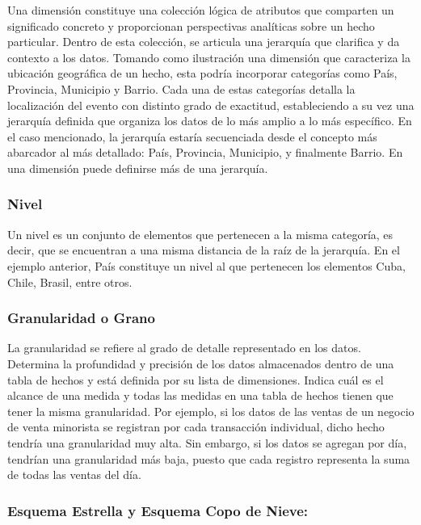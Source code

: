 Una dimensión constituye una colección lógica de atributos que comparten un significado concreto y proporcionan 
perspectivas analíticas sobre un hecho particular. Dentro de esta colección, se articula una jerarquía que clarifica y da contexto a los 
datos. Tomando como ilustración una dimensión que caracteriza la ubicación geográfica de un hecho, esta podría incorporar categorías 
como País, Provincia, Municipio y Barrio. Cada una de estas categorías detalla la localización del evento con distinto grado de 
exactitud, estableciendo a su vez una jerarquía definida que organiza los datos de lo más amplio a lo más específico. En el 
caso mencionado, la jerarquía estaría secuenciada desde el concepto más abarcador al más detallado: País, Provincia, 
Municipio, y finalmente Barrio. En una dimensión puede definirse m\'as de una jerarquía\cite{lismaster}.

\subsubsection{Nivel}

Un nivel es un conjunto de elementos que pertenecen a la misma categoría, es decir, que se encuentran a una misma distancia 
de la raíz de la jerarquía. En el ejemplo anterior, Pa\'is constituye un nivel al que pertenecen los elementos Cuba, Chile, 
Brasil, entre otros.

\subsubsection{Granularidad o Grano}

La granularidad se refiere al grado de detalle representado en los datos. Determina 
la profundidad y precisión de los datos almacenados dentro de una tabla de hechos y est\'a definida por su lista de dimensiones. 
Indica cu\'al es el alcance de una medida y todas las medidas en una tabla de hechos tienen que tener la misma 
granularidad\cite{kimball2011data}. Por ejemplo, si los datos de las ventas de un negocio de venta minorista 
se registran por cada transacción individual, dicho hecho tendr\'ia una granularidad muy alta. Sin embargo, 
si los datos se agregan por d\'ia, tendrían una granularidad m\'as baja, puesto que cada registro representa la suma 
de todas las ventas del d\'ia.

\subsubsection{Esquema Estrella y Esquema Copo de Nieve:}

